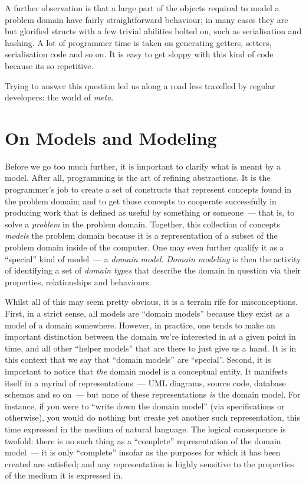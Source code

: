 \documentclass{book}
\begin{document}
A further observation is that a large part of the objects required to
model a problem domain have fairly straightforward behaviour; in many
cases they are but glorified structs with a few trivial abilities
bolted on, such as serialisation and hashing. A lot of programmer time
is taken on generating getters, setters, serialisation code and so
on. It is easy to get sloppy with this kind of code because its so
repetitive.

Trying to answer this question led us along a road less travelled by
regular developers: the world of \emph{meta}.

\section{On Models and Modeling}

Before we go too much further, it is important to clarify what is
meant by a model. After all, programming is the art of refining
abstractions. It is the programmer's job to create a set of constructs
that represent concepts found in the problem domain; and to get those
concepts to cooperate successfully in producing work that is defined
as useful by something or someone~--- that is, to solve a
\emph{problem} in the problem domain. Together, this collection of
concepts \emph{models} the problem domain because it is a
representation of a subset of the problem domain inside of the
computer. One may even further qualify it as a ``special'' kind of
model~--- a \emph{domain model}. \emph{Domain modeling} is then the
activity of identifying a set of \emph{domain types} that describe the
domain in question via their properties, relationships and behaviours.

Whilst all of this may seem pretty obvious, it is a terrain rife for
misconceptions. First, in a strict sense, all models are ``domain
models'' because they exist as a model of a domain somewhere. However,
in practice, one tends to make an important distinction between the
domain we're interested in at a given point in time, and all other
``helper models'' that are there to just give us a hand. It is in this
context that we say that ``domain models'' are ``special''. Second, it
is important to notice that \emph{the} domain model is a conceptual
entity. It manifests itself in a myriad of representations~--- UML
diagrams, source code, database schemas and so on~--- but none of
these representations \emph{is} the domain model. For instance, if you
were to ``write down the domain model'' (via specifications or
otherwise), you would do nothing but create yet another such
representation, this time expressed in the medium of natural
language. The logical consequence is twofold: there is no such thing
as a ``complete'' representation of the domain model~--- it is only
``complete'' insofar as the purposes for which it has been created are
satisfied; and any representation is highly sensitive to the
properties of the medium it is expressed in.
\end{document}
